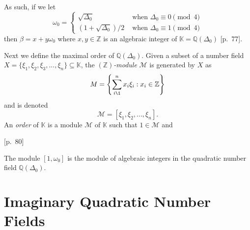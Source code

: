 \documentclass[11pt, letterpaper]{book}
\theoremstyle{definition}
\newcommand{\KK}{\mathbb{K}}
\newcommand{\MM}{\mathcal{M}}
\newcommand{\ZZ}{\mathbb{Z}}
\newcommand{\QQ}{\mathbb{Q}}
\begin{document}
As such, if we let 
\[
	\omega_0 = \begin{cases}
		\sqrt{\Delta_0} & \textrm{ when } \Delta_0 \equiv 0 \pmod 4 \\
		(1+\sqrt{\Delta_0})/2 & \textrm{ when } \Delta_0 \equiv 1 \pmod 4
	\end{cases}
\]
then $\beta = x + y \omega_0$ where $x,y \in \ZZ$ is an algebraic integer of $\KK = \QQ(\Delta_0)$ \cite{JacobsonCh4}[p.~77].

\bigbreak
Next we define the maximal order of $\QQ(\Delta_0)$.  Given a subset of a number field $X = \{ \xi_1, \xi_2, \xi_3, ..., \xi_n \} \subseteq \KK$, the \emph{$(\ZZ)$-module} $\MM$ is generated by $X$ as
\[
	M = \left \{ \sum_{i\1}^n x_i \xi_i : x_i \in \ZZ \right \}
\]
and is denoted
\[
	\MM = [ \xi_1, \xi_2, ..., \xi_n ].
\]
An \emph{order} of $\KK$ is a module $\MM$ of $\KK$ such that $1 \in \MM$ and 

\cite{JacobsonCh4}[p.~80]

The module $[1, \omega_0]$ is the module of algebraic integers in the quadratic number field $\QQ(\Delta_0)$.


\section{Imaginary Quadratic Number Fields}
\end{document}
